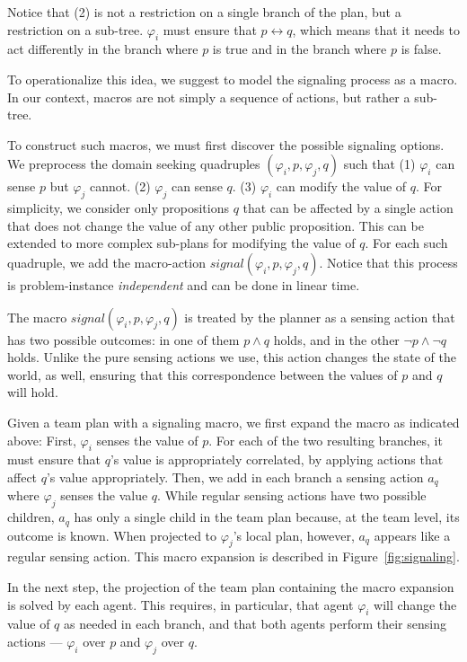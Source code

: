\documentclass[letterpaper]{article} %
\theoremstyle{definition}
\begin{document}
Notice that (2) is not a restriction on a single branch of the plan, but a restriction on a sub-tree. $\varphi_i$ must ensure that $p\leftrightarrow q$, which means that it needs to act differently in the
branch where $p$ is true and in the branch where $p$ is false.

To operationalize this idea, we suggest to model the signaling process as a macro.
In our context, macros are not simply
a sequence of actions, but rather a sub-tree.

To construct such macros, we must first discover the possible signaling options. We preprocess the domain seeking quadruples $(\varphi_i, p, \varphi_j, q)$ such that
(1) $\varphi_i$ can sense $p$ but $\varphi_j$ cannot. (2) $\varphi_j$ can sense $q$.
(3) $\varphi_i$ can modify the value of $q$.
For simplicity, we consider only propositions $q$ that can be affected by a single action that does not change the value of any other public proposition. This can be extended to more complex sub-plans for modifying the value of $q$.
For each such quadruple, we add the macro-action $signal(\varphi_i, p, \varphi_j, q)$. Notice that this process is problem-instance {\em independent} and can be done in linear time.


The macro $signal(\varphi_i, p, \varphi_j, q)$ is treated by the planner as a sensing action that has two possible outcomes: in one of them $p\wedge q$ holds, and in the other $\neg p\wedge \neg q$ holds. Unlike the pure sensing actions we use, this action changes the state of the world, as well, ensuring that this correspondence between the values of $p$ and $q$ will hold.

Given a team plan with a signaling macro, we first expand the macro as indicated above: First, $\varphi_i$ senses the value of $p$. For each of the two resulting branches, it must ensure that $q$'s value is appropriately correlated, by applying actions that affect $q$'s value appropriately. Then, we add in each branch a sensing action $a_q$ where $\varphi_j$ senses the value $q$. While regular sensing actions have two possible children, $a_q$ has only a single child in the team plan because, at the team level, its outcome is known.
When projected to $\varphi_j$'s local plan, however, $a_q$ appears like a regular sensing action. This macro expansion is described in Figure~\ref{fig:signaling}.



In the next step, the projection of the team plan containing the macro expansion is solved by each agent. This requires, in particular, that agent $\varphi_i$ will change the value of $q$ as needed in each branch, and that both agents perform their sensing actions --- $\varphi_i$ over $p$ and $\varphi_j$ over $q$.
\end{document}

